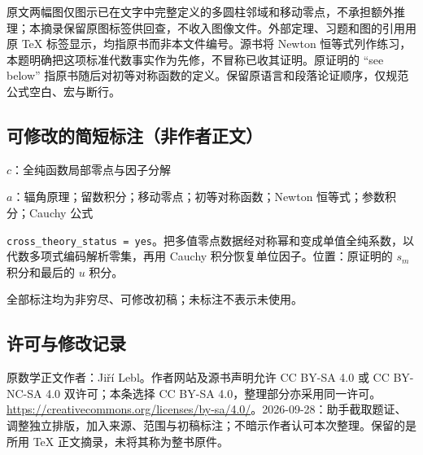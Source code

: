 \documentclass[UTF8,11pt]{ctexart}
\theoremstyle{definition}
\begin{document}
原文两幅图仅图示已在文字中完整定义的多圆柱邻域和移动零点，不承担额外推理；本摘录保留原图标签供回查，不收入图像文件。外部定理、习题和图的引用用原 TeX 标签显示，均指原书而非本文件编号。源书将 Newton 恒等式列作练习，本题明确把这项标准代数事实作为先修，不冒称已收其证明。原证明的 ``see below'' 指原书随后对初等对称函数的定义。保留原语言和段落论证顺序，仅规范公式空白、宏与断行。
\subsection*{可修改的简短标注（非作者正文）}
$c$：全纯函数局部零点与因子分解

$a$：辐角原理；留数积分；移动零点；初等对称函数；Newton 恒等式；参数积分；Cauchy 公式

\texttt{cross\_theory\_status = yes}。把多值零点数据经对称幂和变成单值全纯系数，以代数多项式编码解析零集，再用 Cauchy 积分恢复单位因子。位置：原证明的 $s_m$ 积分和最后的 $u$ 积分。

全部标注均为非穷尽、可修改初稿；未标注不表示未使用。
\subsection*{许可与修改记录}
原数学正文作者：Ji\v{r}\'i Lebl。作者网站及源书声明允许 CC BY-SA 4.0 或 CC BY-NC-SA 4.0 双许可；本条选择 CC BY-SA 4.0，整理部分亦采用同一许可。\url{https://creativecommons.org/licenses/by-sa/4.0/}。2026-09-28：助手截取题证、调整独立排版，加入来源、范围与初稿标注；不暗示作者认可本次整理。保留的是所用 TeX 正文摘录，未将其称为整书原件。
\end{document}
